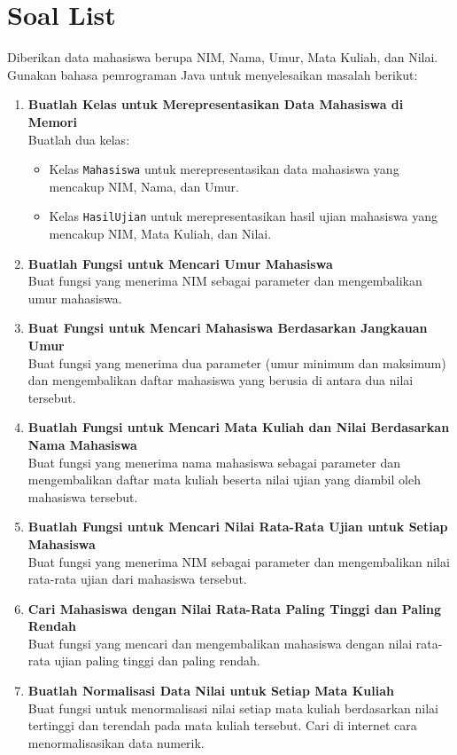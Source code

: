 \section{Soal List}
Diberikan data mahasiswa berupa NIM, Nama, Umur, Mata Kuliah, dan Nilai. Gunakan bahasa pemrograman Java untuk menyelesaikan masalah berikut:

\begin{enumerate}
	\item \textbf{Buatlah Kelas untuk Merepresentasikan Data Mahasiswa di Memori} \\
	Buatlah dua kelas:
	\begin{itemize}
		\item Kelas \texttt{Mahasiswa} untuk merepresentasikan data mahasiswa yang mencakup NIM, Nama, dan Umur.
		\item Kelas \texttt{HasilUjian} untuk merepresentasikan hasil ujian mahasiswa yang mencakup NIM, Mata Kuliah, dan Nilai.
	\end{itemize}
	
	\item \textbf{Buatlah Fungsi untuk Mencari Umur Mahasiswa} \\
	Buat fungsi yang menerima NIM sebagai parameter dan mengembalikan umur mahasiswa.
	
	\item \textbf{Buat Fungsi untuk Mencari Mahasiswa Berdasarkan Jangkauan Umur} \\
	Buat fungsi yang menerima dua parameter (umur minimum dan maksimum) dan mengembalikan daftar mahasiswa yang berusia di antara dua nilai tersebut.
	
	\item \textbf{Buatlah Fungsi untuk Mencari Mata Kuliah dan Nilai Berdasarkan Nama Mahasiswa} \\
	Buat fungsi yang menerima nama mahasiswa sebagai parameter dan mengembalikan daftar mata kuliah beserta nilai ujian yang diambil oleh mahasiswa tersebut.
	
	\item \textbf{Buatlah Fungsi untuk Mencari Nilai Rata-Rata Ujian untuk Setiap Mahasiswa} \\
	Buat fungsi yang menerima NIM sebagai parameter dan mengembalikan nilai rata-rata ujian dari mahasiswa tersebut.
	
	\item \textbf{Cari Mahasiswa dengan Nilai Rata-Rata Paling Tinggi dan Paling Rendah} \\
	Buat fungsi yang mencari dan mengembalikan mahasiswa dengan nilai rata-rata ujian paling tinggi dan paling rendah.
	
	\item \textbf{Buatlah Normalisasi Data Nilai untuk Setiap Mata Kuliah} \\
	Buat fungsi untuk menormalisasi nilai setiap mata kuliah berdasarkan nilai tertinggi dan terendah pada mata kuliah tersebut. Cari di internet cara menormalisasikan data numerik.
	
	
\end{enumerate}


